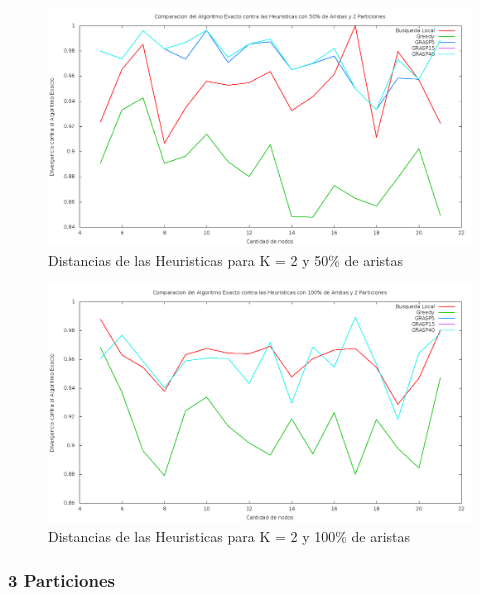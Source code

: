 \begin{figure}[H]
\begin{center}
\includegraphics[scale=0.3]{finales/ComparacionesCon2Particiones50Aristas.png}
\caption{Distancias de las Heuristicas para K = 2 y 50\% de aristas}
\end{center}
\end{figure}

\begin{figure}[H]
\begin{center}
\includegraphics[scale=0.3]{finales/ComparacionesCon2Particiones100Aristas.png}
\caption{Distancias de las Heuristicas para K = 2 y 100\% de aristas}
\end{center}
\end{figure}

\subsubsection{3 Particiones}

